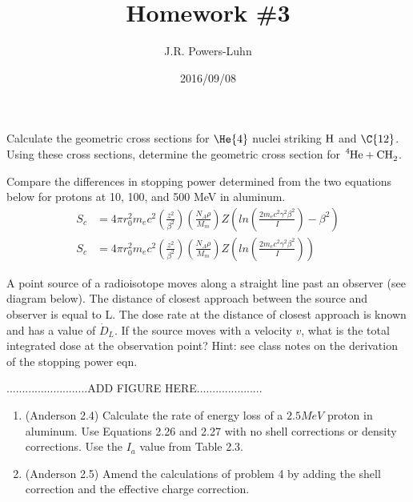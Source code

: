\documentclass{hw}
\author{J.R. Powers-Luhn}
\date{2016/09/08}
\title{Homework \#3}
\begin{document}
\problem{}
	Calculate the geometric cross sections for $ \He{4} $ nuclei striking $ \ce{H} $ and $ \C{12} $. Using these cross sections, determine the geometric cross section for $ \ce{^4He + CH_2} $.

\solution


\problem{}
	Compare the differences in stopping power determined from the two equations below for protons at 10, 100, and 500 MeV in aluminum.
		\begin{align}
			S_c &= 4 \pi r_0^2 m_e c^2 \left( \frac{z^2}{\beta^2} \right) \left( \frac{N_A \rho}{M_m} \right) Z \left( ln \left( \frac{2 m_e c^2 \gamma^2 \beta^2}{I} \right) - \beta^2 \right) \label{betablockwithbeta} \\
			S_c &= 4 \pi r_0^2 m_e c^2 \left( \frac{z^2}{\beta^2} \right) \left( \frac{N_A \rho}{M_m} \right) Z \left( ln \left( \frac{2 m_e c^2 \gamma^2 \beta^2}{I} \right)\right) \label{betablockwithoutbeta}
		\end{align}

\solution


\problem{}
	A point source of a radioisotope moves along a straight line past an observer (see diagram below). The distance of closest approach between the source and observer is equal to L. The dose rate at the distance of closest approach is known and has a value of $ \dot{D}_L $. If the source moves with a velocity $ v $, what is the total integrated dose at the observation point? Hint: see class notes on the derivation of the stopping power eqn.

	..........................ADD FIGURE HERE.....................

\solution


	\begin{enumerate}
		\item (Anderson 2.4) Calculate the rate of energy loss of a $ 2.5 MeV $ proton in aluminum. Use Equations 2.26 and 2.27 with no shell corrections or density corrections. Use the $ I_a $ value from Table 2.3.
		\item (Anderson 2.5) Amend the calculations of problem 4 by adding the shell correction and the effective charge correction.
	\end{enumerate}

\solution
\end{document}
